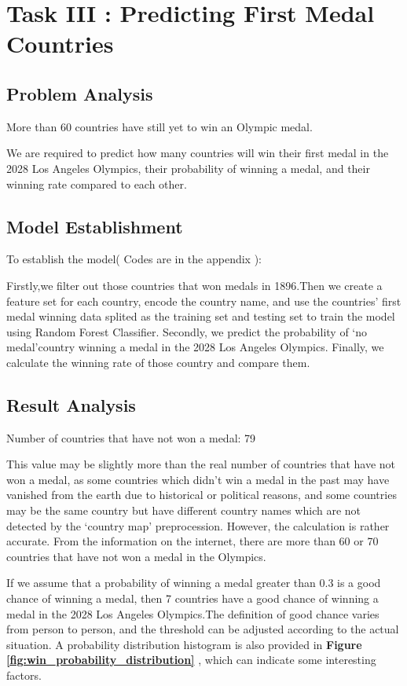 \section{Task III : Predicting First Medal Countries}
\subsection{Problem Analysis}

More than 60 countries have still yet to win an Olympic medal.

We are required to predict how many countries will win their first medal in the 2028 Los Angeles Olympics, their probability of winning a medal, and their winning rate compared to each other.
\subsection{Model Establishment}

To establish the model( Codes are in the appendix ):

Firstly,we filter out those countries that won medals in 1896.Then we create a feature set for each country, encode the country name, and use the countries' first medal winning data splited as the training set and testing set to train the model using Random Forest Classifier.
Secondly, we predict the probability of `no medal'country winning a medal in the 2028 Los Angeles Olympics.
Finally, we calculate the winning rate of those country and compare them.



\subsection{Result Analysis}
Number of countries that have not won a medal: 79

This value may be slightly more than the real number of countries that have not won a medal, as some countries which didn't win a medal in the past may have vanished from the earth due to historical or political reasons, and some countries may be the same country but have different country names which are not detected by the `country map' preprocession. However, the calculation is rather accurate. From the information on the internet, there are more than 60 or 70 countries that have not won a medal in the Olympics.

If we assume that a probability of winning a medal greater than 0.3 is a good chance of winning a medal, then 7 countries have a good chance of winning a medal in the 2028 Los Angeles Olympics.The definition of good chance varies from person to person, and the threshold can be adjusted according to the actual situation. A probability distribution histogram is also provided in \textbf{Figure \ref{fig:win_probability_distribution}} , which can indicate some interesting factors.



